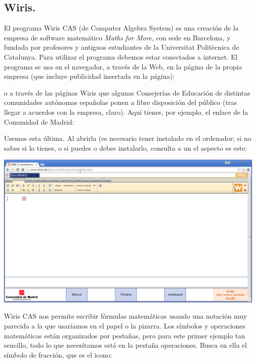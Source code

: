 \documentclass[10pt,a4paper]{article}\usepackage[]{graphicx}\usepackage[]{color}
\begin{document}
\subsection{Wiris.}
\label{tut03:subsec:Wiris}

El programa Wiris CAS (de Computer Algebra System) es una creación de la empresa de software matemático {\em Maths for More}, con sede en Barcelona, y fundada por profesores y antiguos estudiantes de la Universitat Politècnica de Catalunya. Para utilizar el programa debemos estar conectados a internet.  El programa se usa en el navegador, a través de la Web, en la página de la propia empresa (que incluye publicidad insertada en la página):
     \begin{center}
\end{center}
o a través de las páginas Wiris que algunas Consejerías de Educación de distintas comunidades autónomas españolas ponen a libre disposición del público (tras llegar a acuerdos con la empresa, claro). Aquí tienes, por ejemplo, el enlace de la Comunidad de Madrid:
     \begin{center}
\end{center}
Usemos esta última. Al abrirla (es necesario tener instalado  en el ordenador; si no sabes si lo tienes, o si puedes o debes instalarlo, consulta a un  el aspecto es este:
     \begin{center}
\includegraphics[width=15.5cm]{./fig/Tut04-09.png}
\end{center}
Wiris CAS nos permite escribir fórmulas matemáticas usando una notación muy parecida a la que usaríamos en el papel o la pizarra. Los símbolos y operaciones matemáticas están organizados por pestañas, pero para este primer ejemplo tan sencillo, todo lo que necesitamos está en la pestaña operaciones. Busca en ella el símbolo de fracción, que es el icono:
\end{document}

